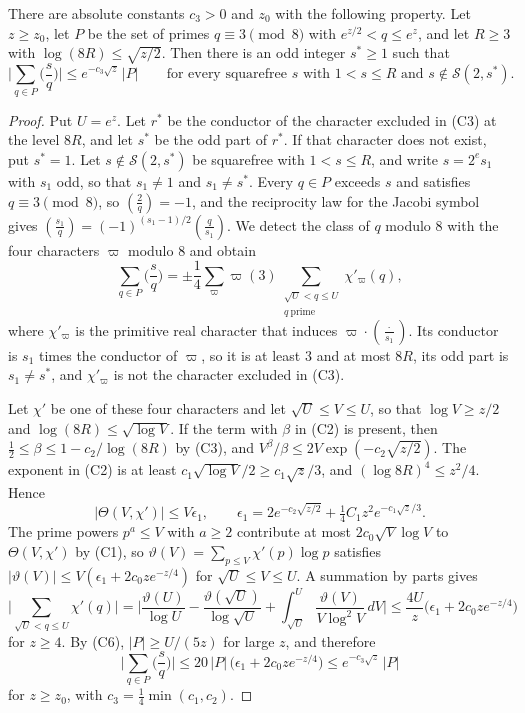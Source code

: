 \begin{proposition}\label{legendre}
There are absolute constants $c_3>0$ and $z_0$ with the following property. Let $z\ge z_0$, let $P$ be the set of primes $q\equiv3\pmod8$ with $e^{z/2}<q\le e^z$, and let $R\ge3$ with $\log(8R)\le\sqrt{z/2}$. Then there is an odd integer $s^\ast\ge1$ such that
\[
\Big\lvert\sum_{q\in P}\Big(\frac sq\Big)\Big\rvert\le e^{-c_3\sqrt z}\,\lvert P\rvert\qquad\text{for every squarefree }s\text{ with }1<s\le R\text{ and }s\notin\mathcal S(2,s^\ast).
\]
\end{proposition}

\begin{proof}
Put $U=e^z$. Let $r^\ast$ be the conductor of the character excluded in (C3) at the level $8R$, and let $s^\ast$ be the odd part of $r^\ast$. If that character does not exist, put $s^\ast=1$. Let $s\notin\mathcal S(2,s^\ast)$ be squarefree with $1<s\le R$, and write $s=2^es_1$ with $s_1$ odd, so that $s_1\ne1$ and $s_1\ne s^\ast$. Every $q\in P$ exceeds $s$ and satisfies $q\equiv3\pmod8$, so $(\frac2q)=-1$, and the reciprocity law for the Jacobi symbol gives $(\frac{s_1}q)=(-1)^{(s_1-1)/2}(\frac q{s_1})$. We detect the class of $q$ modulo $8$ with the four characters $\varpi$ modulo $8$ and obtain
\[
\sum_{q\in P}\Big(\frac sq\Big)=\pm\frac14\sum_{\varpi}\varpi(3)\sum_{\substack{\sqrt U<q\le U\\ q\ \mathrm{prime}}}\chi'_\varpi(q),
\]
where $\chi'_\varpi$ is the primitive real character that induces $\varpi\cdot(\frac{\cdot}{s_1})$. Its conductor is $s_1$ times the conductor of $\varpi$, so it is at least $3$ and at most $8R$, its odd part is $s_1\ne s^\ast$, and $\chi'_\varpi$ is not the character excluded in (C3).

Let $\chi'$ be one of these four characters and let $\sqrt U\le V\le U$, so that $\log V\ge z/2$ and $\log(8R)\le\sqrt{\log V}$. If the term with $\beta$ in (C2) is present, then $\frac12\le\beta\le1-c_2/\log(8R)$ by (C3), and $V^\beta/\beta\le2V\exp(-c_2\sqrt{z/2})$. The exponent in (C2) is at least $c_1\sqrt{\log V}/2\ge c_1\sqrt z/3$, and $(\log8R)^4\le z^2/4$. Hence
\[
\lvert\Theta(V,\chi')\rvert\le V\epsilon_1,\qquad\epsilon_1=2e^{-c_2\sqrt{z/2}}+\tfrac14C_1z^2e^{-c_1\sqrt z/3}.
\]
The prime powers $p^a\le V$ with $a\ge2$ contribute at most $2c_0\sqrt V\log V$ to $\Theta(V,\chi')$ by (C1), so $\vartheta(V)=\sum_{p\le V}\chi'(p)\log p$ satisfies $\lvert\vartheta(V)\rvert\le V(\epsilon_1+2c_0ze^{-z/4})$ for $\sqrt U\le V\le U$. A summation by parts gives
\[
\Big\lvert\sum_{\sqrt U<q\le U}\chi'(q)\Big\rvert=\Big\lvert\frac{\vartheta(U)}{\log U}-\frac{\vartheta(\sqrt U)}{\log\sqrt U}+\int_{\sqrt U}^U\frac{\vartheta(V)}{V\log^2V}\,dV\Big\rvert\le\frac{4U}z\big(\epsilon_1+2c_0ze^{-z/4}\big)
\]
for $z\ge4$. By (C6), $\lvert P\rvert\ge U/(5z)$ for large $z$, and therefore
\[
\Big\lvert\sum_{q\in P}\Big(\frac sq\Big)\Big\rvert\le20\,\lvert P\rvert\,\big(\epsilon_1+2c_0ze^{-z/4}\big)\le e^{-c_3\sqrt z}\,\lvert P\rvert
\]
for $z\ge z_0$, with $c_3=\frac14\min(c_1,c_2)$.
\end{proof}


